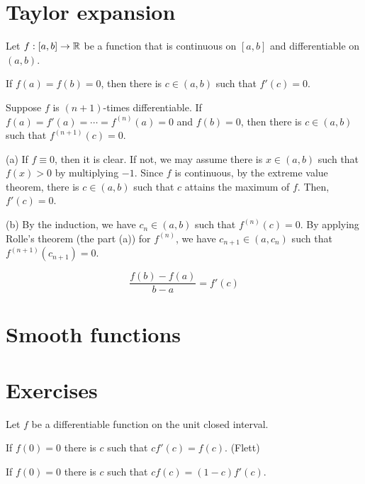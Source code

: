 \documentclass{../../large}
\begin{document}
\section{Taylor expansion}
\begin{prb}
Let $f:[a,b]\to\mathbb{R}$ be a function that is continuous on $[a,b]$ and differentiable on $(a,b)$.
\begin{parts}
\item If $f(a)=f(b)=0$, then there is $c\in(a,b)$ such that $f'(c)=0$.
\item Suppose $f$ is $(n+1)$-times differentiable. If $f(a)=f'(a)=\cdots=f^{(n)}(a)=0$ and $f(b)=0$, then there is $c\in(a,b)$ such that $f^{(n+1)}(c)=0$.
\end{parts}
\end{prb}
\begin{pf}
(a)
If $f\equiv0$, then it is clear.
If not, we may assume there is $x\in(a,b)$ such that $f(x)>0$ by multiplying $-1$.
Since $f$ is continuous, by the extreme value theorem, there is $c\in(a,b)$ such that $c$ attains the maximum of $f$.
Then, $f'(c)=0$.

(b)
By the induction, we have $c_n\in(a,b)$ such that $f^{(n)}(c)=0$.
By applying Rolle's theorem (the part (a)) for $f^{(n)}$, we have $c_{n+1}\in(a,c_n)$ such that $f^{(n+1)}(c_{n+1})=0$.
\end{pf}

\begin{prb}
\[\frac{f(b)-f(a)}{b-a}=f'(c)\]
\end{prb}

\begin{prb}
\end{prb}


\section{Smooth functions}

\section*{Exercises}
\begin{prb}
Let $f$ be a differentiable function on the unit closed interval.
\begin{parts}
\item If $f(0)=0$ there is $c$ such that $cf'(c)=f(c)$. (Flett)
\item If $f(0)=0$ there is $c$ such that $cf(c)=(1-c)f'(c)$.
\end{parts}
\end{prb}
\begin{prb}
\end{prb}
\begin{prb}
\end{prb}
\end{document}

